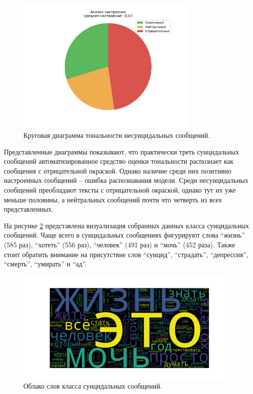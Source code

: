 \begin{figure}[H]
	\centering
	\includegraphics[width=0.8\textwidth]{inc/plots/sentiments_non_suicidal.pdf}
	\caption{ Круговая диаграмма тональности несуицидальных сообщений. }
	\label{img:sentiments2}
\end{figure}

Представленные диаграммы показывают, что практически треть суицидальных сообщений автоматизированное средство оценки тональности распознает как сообщения с отрицательной окраской. Однако наличие среди них позитивно настроенных сообщений -- ошибка распознавания модели. Среди несуицидальных сообщений преобладают тексты с отрицательной окраской, однако тут их уже меньше половины, а нейтральных сообщений почти что четверть из всех представленных. 

На рисунке \ref{img:cloud1} представлена визуализация собранных данных класса суицидальных сообщений. Чаще всего в суицидальных сообщениях фигурируют слова ``жизнь'' (585 раз), ``хотеть'' (556 раз), ``человек'' (491 раз) и ``мочь'' (452 раза). Также стоит обратить внимание на присутствие слов ``суицид'', ``страдать'', ``депрессия'', ``смерть'', ``умирать'' и ``ад''.

\begin{figure}[H]
	\centering
	\includegraphics[width=\textwidth]{inc/cloudSuicidal.pdf}
	\caption{ Облако слов класса суицидальных сообщений. }
	\label{img:cloud1}
\end{figure}

